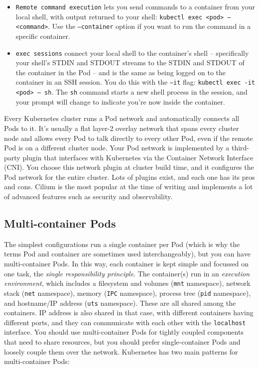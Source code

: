 \documentclass[table, xcdraw]{article}%
\begin{document}
\begin{itemize}
	\item \texttt{Remote command execution} lets you send commands to a container from your local shell, with output returned to your shell: \texttt{kubectl exec <pod> -- <command>}. Use the \texttt{--container} option if you want to run the command in a specific container.
	\item \texttt{exec sessions} connect your local shell to the container’s shell -- specifically your shell’s STDIN and STDOUT streams to the STDIN and STDOUT of the container in the Pod -- and is the same as being logged on to the container in an SSH session. You do this with the \texttt{--it} flag: \texttt{kubectl exec -it <pod> -- sh}. The \texttt{sh} command starts a new shell process in the session, and your prompt will change to indicate you’re now inside the container.
\end{itemize}

Every Kubernetes cluster runs a Pod network and automatically connects all Pods to it. It’s usually a flat layer-2 overlay network that spans every cluster node and allows every Pod to talk directly to every other Pod, even if the remote Pod is on a different cluster node. Your Pod network is implemented by a third-party plugin that interfaces with Kubernetes via the Container Network Interface (CNI). You choose this network plugin at cluster build time, and it configures the Pod network for the entire cluster. Lots of plugins exist, and each one has its pros and cons. Cilium is the most popular at the time of writing and implements a lot of advanced features such as security and observability.

\subsection{Multi-container Pods}

The simplest configurations run a single container per Pod (which is why the terms Pod and container are sometimes used interchangeably), but you can have multi-container Pods. In this way, each container is kept simple and focussed on one task, the \emph{single responsibility principle}. The container(s) run in an \emph{execution environment}, which includes a filesystem and volumes (\texttt{mnt} namespace), network stack (\texttt{net} namespace), memory (\texttt{IPC} namespace), process tree (\texttt{pid} namespace), and hostname/IP address (\texttt{uts} namespace). These are all shared among the containers. IP address is also shared in that case, with different containers having different ports, and they can communicate with each other with the \texttt{localhost} interface. You should use multi-container Pods for tightly coupled components that need to share resources, but you should prefer single-container Pods and loosely couple them over the network. Kubernetes has two main patterns for multi-container Pods:
\end{document}
